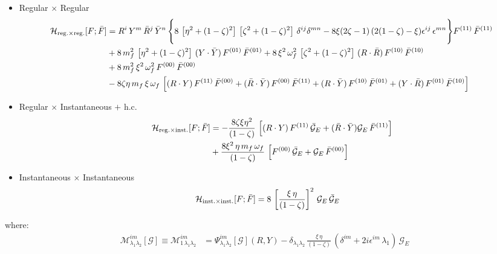 \documentclass[9pt]{article}
\numberwithin{equation}{section}
\begin{document}
\begin{itemize}
    \item Regular $\times$ Regular
    \begin{align}
        \mathcal{H}_{\mathrm{reg.}\times \mathrm{reg.}}[F;\Bar{F}] & = R^{i}\,Y^{m}\,\Bar{R}^{j}\,\Bar{Y}^{n}\,\Bigg\{8\,\left[\eta^{2}+(1-\zeta)^{2}\right]\,\left[\zeta^{2} + (1-\zeta)^{2}\right]\,\delta^{ij}\delta^{mn}-8\xi(2\zeta - 1)\, (2(1-\zeta)-\xi)\epsilon^{ij}\,\epsilon^{mn}\Bigg\}F^{(11)}\,\Bar{F}^{(11)}\notag \\ & +8\,m^{2}_{f}\,\left[\eta^{2} + (1-\zeta)^{2}\right]\, (Y\cdot \Bar{Y})\,F^{(01)}\,\Bar{F}^{(01)}+8\,\xi^{2}\,\omega^{2}_{f}\,\left[\zeta^{2}+(1-\zeta)^{2}\right]\, (R\cdot \Bar{R})\, F^{(10)}\,\Bar{F}^{(10)} \notag \\ & + 8\,m^{2}_{f}\,\xi^{2}\,\omega^{2}_{f}\,F^{(00)}\,\Bar{F}^{(00)}\notag \\ & -8\zeta\eta\, m_{f}\,\xi\,\omega_{f}\, \left[(R\cdot Y)\,F^{(11)}\,\Bar{F}^{(00)} + (\Bar{R}\cdot \Bar{Y})\,F^{(00)}\,\Bar{F}^{(11)} + (R\cdot \Bar{Y})\,F^{(10)}\,\Bar{F}^{(01)} + (Y\cdot \Bar{R})\,F^{(01)}\,\Bar{F}^{(10)}\right]
    \end{align}
    \item Regular $\times$ Instantaneous $+$ h.c.
    \begin{align}
        \mathcal{H}_{\mathrm{reg.}\times \mathrm{inst.}}[F;\Bar{F}] & = -\frac{8\zeta\xi\eta^{2}}{(1-\zeta)}\, \left[(R\cdot Y)\,F^{(11)}\,\mathcal{\Bar{G}}_{E} + (\Bar{R}\cdot \Bar{Y})\mathcal{G}_{E}\,\Bar{F}^{(11)}\right]\notag \\ & +\frac{8\xi^{2}\,\eta\,m_{f}\,\omega_{f}}{(1-\zeta)}\,\left[F^{(00)}\,\mathcal{\Bar{G}}_{E} + \mathcal{G}_{E}\,\Bar{F}^{(00)}\right]
    \end{align}
    \item Instantaneous $\times$ Instantaneous
    \begin{align}
       \mathcal{H}_{\mathrm{inst.}\times \mathrm{inst.}}[F;\Bar{F}] & = 8\,\left[\frac{\xi\,\eta}{(1-\zeta)}\right]^{2}\, \mathcal{G}_{E}\, \mathcal{\Bar{G}}_{E}
    \end{align}
\end{itemize}
where: 
\begin{align}
\mathcal{M}^{im}_{\lambda_{1}\lambda_{2}}[\mathcal{G}] \equiv \mathcal{M}^{im}_{1\,\lambda_{1}\lambda_{2}} & = \Psi^{im}_{\lambda_{1}\lambda_{2}}[\mathcal{G}](R,Y) - \delta_{\lambda_{1}\lambda_{2}}\,\frac{\xi\,\eta}{(1-\zeta)}\,\left(\delta^{im}+2i\epsilon^{im}\,\lambda_{1}\right)\,\mathcal{G}_{E}
\end{align}
\end{document}
